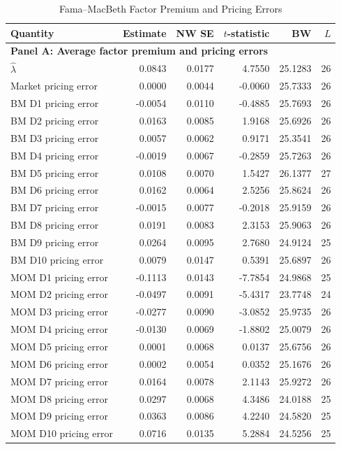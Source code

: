 \begin{table}[H]
  \centering
  \caption{Fama--MacBeth Factor Premium and Pricing Errors}
  \label{tab:4e-fama-macbeth}
  \begin{minipage}{0.99\textwidth}
    \centering
    \scriptsize
    \begin{tabular*}{\linewidth}{@{\extracolsep{\fill}}lrrrrr@{}}
      \toprule
      Quantity & Estimate & NW SE & $t$-statistic & BW & $L$ \\
      \midrule
      \multicolumn{6}{l}{\textbf{Panel A: Average factor premium and pricing errors}} \\
      $\hat{\lambda}$ & 0.0843 & 0.0177 & 4.7550 & 25.1283 & 26 \\
      Market pricing error & 0.0000 & 0.0044 & -0.0060 & 25.7333 & 26 \\
      BM D1 pricing error & -0.0054 & 0.0110 & -0.4885 & 25.7693 & 26 \\
      BM D2 pricing error & 0.0163 & 0.0085 & 1.9168 & 25.6926 & 26 \\
      BM D3 pricing error & 0.0057 & 0.0062 & 0.9171 & 25.3541 & 26 \\
      BM D4 pricing error & -0.0019 & 0.0067 & -0.2859 & 25.7263 & 26 \\
      BM D5 pricing error & 0.0108 & 0.0070 & 1.5427 & 26.1377 & 27 \\
      BM D6 pricing error & 0.0162 & 0.0064 & 2.5256 & 25.8624 & 26 \\
      BM D7 pricing error & -0.0015 & 0.0077 & -0.2018 & 25.9159 & 26 \\
      BM D8 pricing error & 0.0191 & 0.0083 & 2.3153 & 25.9063 & 26 \\
      BM D9 pricing error & 0.0264 & 0.0095 & 2.7680 & 24.9124 & 25 \\
      BM D10 pricing error & 0.0079 & 0.0147 & 0.5391 & 25.6897 & 26 \\
      MOM D1 pricing error & -0.1113 & 0.0143 & -7.7854 & 24.9868 & 25 \\
      MOM D2 pricing error & -0.0497 & 0.0091 & -5.4317 & 23.7748 & 24 \\
      MOM D3 pricing error & -0.0277 & 0.0090 & -3.0852 & 25.9735 & 26 \\
      MOM D4 pricing error & -0.0130 & 0.0069 & -1.8802 & 25.0079 & 26 \\
      MOM D5 pricing error & 0.0001 & 0.0068 & 0.0137 & 25.6756 & 26 \\
      MOM D6 pricing error & 0.0002 & 0.0054 & 0.0352 & 25.1676 & 26 \\
      MOM D7 pricing error & 0.0164 & 0.0078 & 2.1143 & 25.9272 & 26 \\
      MOM D8 pricing error & 0.0297 & 0.0068 & 4.3486 & 24.0188 & 25 \\
      MOM D9 pricing error & 0.0363 & 0.0086 & 4.2240 & 24.5820 & 25 \\
      MOM D10 pricing error & 0.0716 & 0.0135 & 5.2884 & 24.5256 & 25 \\
      \bottomrule
    \end{tabular*}


\end{minipage}
\end{table}
